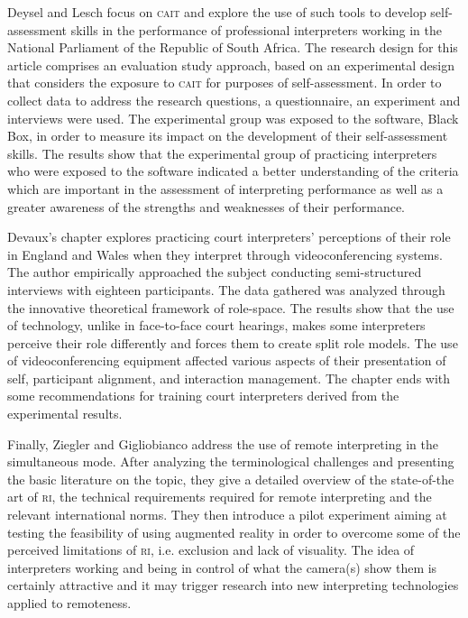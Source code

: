 \documentclass[output=paper]{langsci/langscibook}
\begin{document}
Deysel and Lesch focus on \textsc{cait} and explore the use of such tools to develop self-assessment skills in the performance of professional interpreters working in the National Parliament of the Republic of South Africa. The research design for this article comprises an evaluation study approach, based on an experimental design that considers the exposure to \textsc{cait} for purposes of self-assessment. In order to collect data to address the research questions, a questionnaire, an experiment and interviews were used. The experimental group was exposed to the software, Black Box, in order to measure its impact on the development of their self-assessment skills. The results show that the experimental group of practicing interpreters who were exposed to the software indicated a better understanding of the criteria which are important in the assessment of interpreting performance as well as a greater awareness of the strengths and weaknesses of their performance. 
 
Devaux’s chapter explores practicing court interpreters’ perceptions of their role in England and Wales when they interpret through videoconferencing systems. The author empirically approached the subject conducting semi-structured interviews with eighteen participants. The data gathered was analyzed through the innovative theoretical framework of role-space. The results show that the use of technology, unlike in face-to-face court hearings, makes some interpreters perceive their role differently and forces them to create split role models. The use of videoconferencing equipment affected various aspects of their presentation of self, participant alignment, and interaction management. The chapter ends with some recommendations for training court interpreters derived from the experimental results. 
 
Finally, Ziegler and Gigliobianco address the use of remote interpreting in the simultaneous mode. After analyzing the terminological challenges and presenting the basic literature on the topic, they give a detailed overview of the state-of-the art of \textsc{ri}, the technical requirements required for remote interpreting and the relevant international norms. They then introduce a pilot experiment aiming at testing the feasibility of using augmented reality in order to overcome some of the perceived limitations of \textsc{ri}, i.e. exclusion and lack of visuality. The idea of interpreters working and being in control of what the camera(s) show them is certainly attractive and it may trigger research into new interpreting technologies applied to remoteness. 
 
\end{document}
